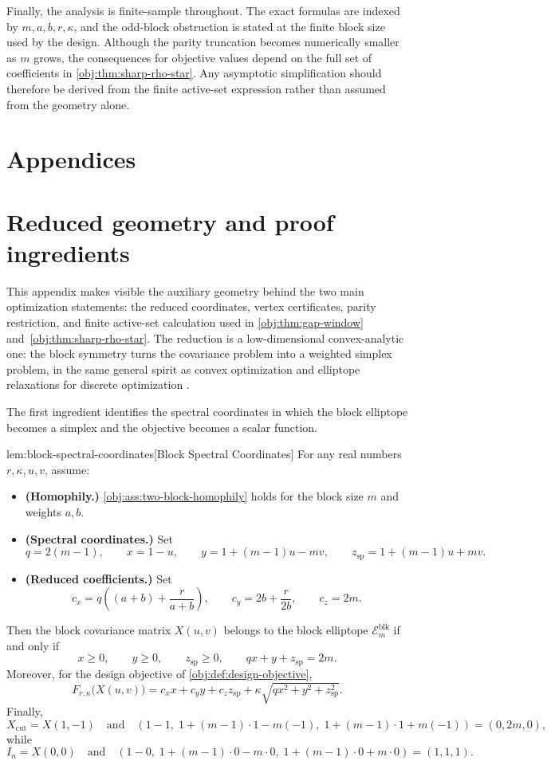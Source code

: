 \documentclass[11pt]{article}
\begin{document}
Finally, the analysis is finite-sample throughout. The exact formulas are indexed by \(m,a,b,r,\kappa\), and the odd-block obstruction is stated at the finite block size used by the design. Although the parity truncation becomes numerically smaller as \(m\) grows, the consequences for objective values depend on the full set of coefficients in \cref{obj:thm:sharp-rho-star}. Any asymptotic simplification should therefore be derived from the finite active-set expression rather than assumed from the geometry alone.


\appendix

\section*{Appendices}

\section{Reduced geometry and proof ingredients}

This appendix makes visible the auxiliary geometry behind the two main optimization statements: the reduced coordinates, vertex certificates, parity restriction, and finite active-set calculation used in \cref{obj:thm:gap-window} and~\cref{obj:thm:sharp-rho-star}. The reduction is a low-dimensional convex-analytic one: the block symmetry turns the covariance problem into a weighted simplex problem, in the same general spirit as convex optimization \citep{boyd2004} and elliptope relaxations for discrete optimization \citep{goemans1995,deza1997}.

The first ingredient identifies the spectral coordinates in which the block elliptope becomes a simplex and the objective becomes a scalar function.

\begin{lemmav}{lem:block-spectral-coordinates}[Block Spectral Coordinates]
For any real numbers $r,\kappa,u,v$, assume:
\begin{itemize}
\item \textbf{(Homophily.)} \cref{obj:ass:two-block-homophily} holds for the block size $m$ and weights $a,b$.
\item \textbf{(Spectral coordinates.)} Set
\[
q=2(m-1),\qquad
x=1-u,\qquad
y=1+(m-1)u-mv,\qquad
z_{\mathrm{sp}}=1+(m-1)u+mv .
\]
\item \textbf{(Reduced coefficients.)} Set
\[
c_x=q\left((a+b)+\frac{r}{a+b}\right),\qquad
c_y=2b+\frac{r}{2b},\qquad
c_z=2m .
\]
\end{itemize}
Then the block covariance matrix $X(u,v)$ belongs to the block elliptope $\mathcal E_m^{\mathrm{blk}}$ if and only if
\[
x\ge 0,\qquad y\ge 0,\qquad z_{\mathrm{sp}}\ge 0,\qquad
qx+y+z_{\mathrm{sp}}=2m .
\]
Moreover, for the design objective of \cref{obj:def:design-objective},
\[
F_{r,\kappa}\bigl(X(u,v)\bigr)
=
c_xx+c_yy+c_zz_{\mathrm{sp}}
+\kappa\sqrt{qx^2+y^2+z_{\mathrm{sp}}^2}.
\]
Finally,
\[
X_{\mathrm{cut}}=X(1,-1)
\quad\text{and}\quad
(1-1,\;1+(m-1)\cdot 1-m(-1),\;1+(m-1)\cdot 1+m(-1))
=(0,2m,0),
\]
while
\[
I_n=X(0,0)
\quad\text{and}\quad
(1-0,\;1+(m-1)\cdot 0-m\cdot 0,\;1+(m-1)\cdot 0+m\cdot 0)
=(1,1,1).
\]
\end{lemmav}
\end{document}
